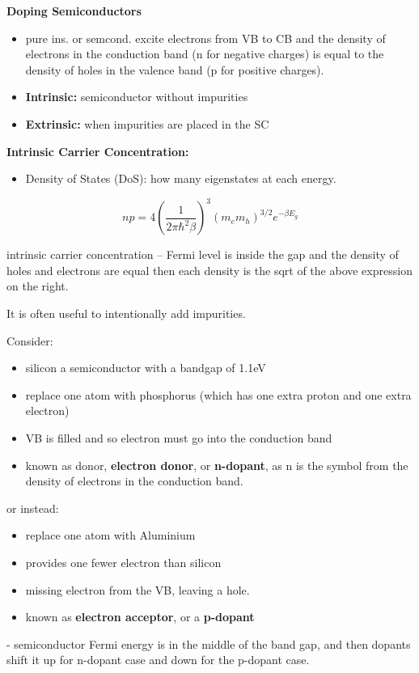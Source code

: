 \textbf{Doping Semiconductors}
\begin{itemize}
    \item pure ins. or semcond. excite electrons from VB to CB and the density of electrons in the conduction band (n for negative charges) is equal to the density of holes in the valence band (p for positive charges).
    \item \textbf{Intrinsic:} semiconductor without impurities
    \item \textbf{Extrinsic:} when impurities are placed in the SC
\end{itemize}



\textbf{Intrinsic Carrier Concentration:}

\begin{itemize}
    \item Density of States (DoS): how many eigenstates at each energy. 
\end{itemize}

 \begin{tcolorbox}[enhanced,attach boxed title to top center={yshift=-3mm,yshifttext=-1mm},
  colback=blue!5!white,colframe=blue!75!black,colbacktitle=red!80!black,
  title=Law of Mass Action,fonttitle=\bfseries,
  boxed title style={size=small,colframe=red!50!black} ]
  \begin{equation}
      np = 4\left(\frac{1}{2\pi\hbar^2\beta}\right)^3(m_em_h)^{3/2}e^{-\beta E_g}
  \end{equation}
\end{tcolorbox}

 intrinsic carrier concentration -- Fermi level is inside the gap and the density of holes and electrons are equal then each density is the sqrt of the above expression on the right.
 
 
 It is often useful to intentionally add impurities.
 
 Consider:
 \begin{itemize}
     \item silicon a semiconductor with a bandgap of 1.1eV
     \item replace one atom with phosphorus (which has one extra proton and one extra electron)
     \item VB is filled and so electron must go into the conduction band
     \item known as donor, \textbf{electron donor}, or \textbf{n-dopant}, as n is the symbol from the density of electrons in the conduction band.
 \end{itemize}
 
 or instead:
 \begin{itemize}
     \item replace one atom with Aluminium
     \item provides one fewer electron than silicon
     \item missing electron from the VB, leaving a hole.
     \item known as \textbf{electron acceptor}, or a \textbf{p-dopant}
 \end{itemize}
 
 - semiconductor Fermi energy is in the middle of the band gap, and then dopants shift it up for n-dopant case and down for the p-dopant case. 
